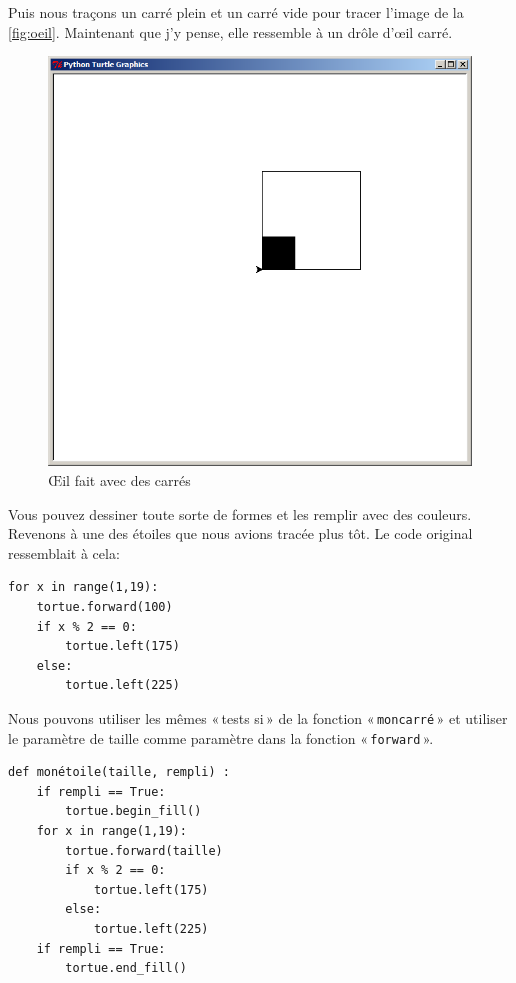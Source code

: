 Puis nous traçons un carré plein et un carré vide pour tracer l'image de la \autoref{fig:oeil}. Maintenant que j'y pense, elle ressemble à un drôle d'œil carré.

\begin{figure}[h!]
\centering
\includegraphics[scale=0.4]{images/oeil}
\caption{Œil fait avec des carrés}\label{fig:oeil}
\end{figure}

Vous pouvez dessiner toute sorte de formes et les remplir avec des couleurs. Revenons à une des étoiles que nous avions tracée plus tôt. Le code original ressemblait à cela:
\begin{Verbatim}[frame=single,rulecolor=\color{gray}, label=ne pas saisir]
for x in range(1,19):
    tortue.forward(100)
    if x % 2 == 0:
        tortue.left(175)
    else:
        tortue.left(225)
\end{Verbatim}

Nous pouvons utiliser les mêmes « tests si »  de la fonction « \texttt{moncarré} » et utiliser le paramètre de taille comme paramètre dans la fonction « \texttt{forward} ».

\begin{Verbatim}[frame=single,rulecolor=\color{mbleu}, label=à taper]
def monétoile(taille, rempli) :
    if rempli == True:
        tortue.begin_fill()
    for x in range(1,19):
        tortue.forward(taille)
        if x % 2 == 0:
            tortue.left(175)
        else:
            tortue.left(225)
    if rempli == True:
        tortue.end_fill()
\end{Verbatim}

